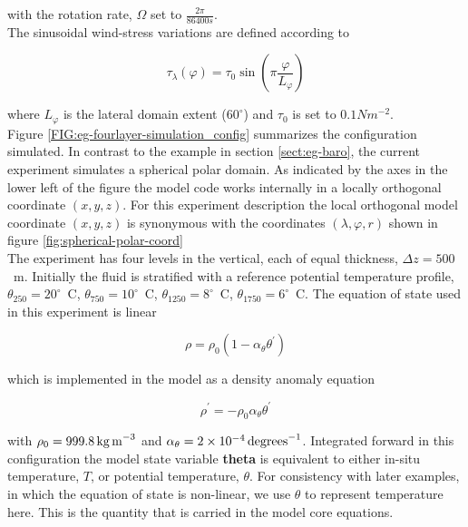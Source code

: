 \noindent with the rotation rate, $\Omega$ set to $\frac{2 \pi}{86400s}$.
\\
  
 The sinusoidal wind-stress variations are defined according to 

\begin{equation}
\label{EQ:taux}
\tau_{\lambda}(\varphi) = \tau_{0}\sin(\pi \frac{\varphi}{L_{\varphi}})
\end{equation}
 
\noindent where $L_{\varphi}$ is the lateral domain extent ($60^{\circ}$) and 
$\tau_0$ is set to $0.1N m^{-2}$. 
\\

Figure \ref{FIG:eg-fourlayer-simulation_config}
summarizes the configuration simulated.
In contrast to the example in section \ref{sect:eg-baro}, the 
current experiment simulates a spherical polar domain. As indicated
by the axes in the lower left of the figure the model code works internally
in a locally orthogonal coordinate $(x,y,z)$. For this experiment description 
the local orthogonal model coordinate $(x,y,z)$ is synonymous 
with the coordinates $(\lambda,\varphi,r)$ shown in figure
\ref{fig:spherical-polar-coord}
\\

The experiment has four levels in the vertical, each of equal thickness,
$\Delta z = 500$~m. Initially the fluid is stratified with a reference
potential temperature profile,
$\theta_{250}=20^{\circ}$~C,
$\theta_{750}=10^{\circ}$~C,
$\theta_{1250}=8^{\circ}$~C,
$\theta_{1750}=6^{\circ}$~C. The equation of state used in this experiment is 
linear

\begin{equation}
\label{EQ:eg-fourlayer-linear1_eos}
\rho = \rho_{0} ( 1 - \alpha_{\theta}\theta^{'} )
\end{equation}

\noindent which is implemented in the model as a density anomaly equation

\begin{equation}
\label{EQ:eg-fourlayer-linear1_eos_pert}
\rho^{'} = -\rho_{0}\alpha_{\theta}\theta^{'}
\end{equation}

\noindent with $\rho_{0}=999.8\,{\rm kg\,m}^{-3}$ and 
$\alpha_{\theta}=2\times10^{-4}\,{\rm degrees}^{-1} $. Integrated forward in
this configuration the model state variable {\bf theta} is equivalent to
either in-situ temperature, $T$, or potential temperature, $\theta$. For 
consistency with later examples, in which the equation of state is
non-linear, we use $\theta$ to represent temperature here. This is
the quantity that is carried in the model core equations.

